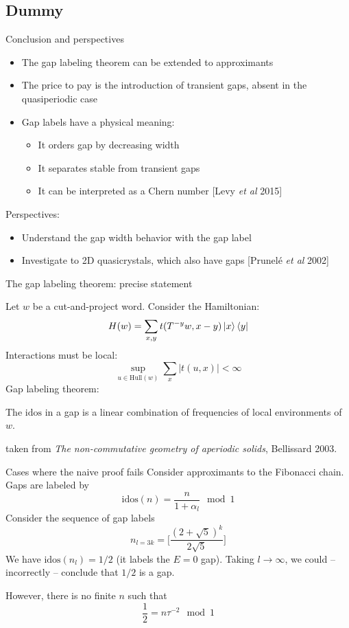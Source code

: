 \documentclass[xcolor=x11names,compress,professionalfonts]{beamer}
\renewcommand{\(}{\begin{columns}}
\renewcommand{\)}{\end{columns}}
\newcommand{\<}[1]{\begin{column}{#1}}
\renewcommand{\>}{\end{column}}
\newcommand{\id}{\ensuremath{\text{idos}}}
\begin{document}
\subsection{Dummy}
\begin{frame}{Conclusion and perspectives}
\begin{itemize}
	\item The gap labeling theorem can be extended to approximants
	\item The price to pay is the introduction of transient gaps, absent in the quasiperiodic case
	\item Gap labels have a physical meaning:
	\begin{itemize}
		\item It orders gap by decreasing width
		\item It separates stable from transient gaps
		\item It can be interpreted as a Chern number \small{[Levy \emph{et al} 2015]}
	\end{itemize}
\end{itemize}
Perspectives:
\begin{itemize}
	\item Understand the gap width behavior with the gap label
	\item Investigate to 2D quasicrystals, which also have gaps \small{[Prunelé \emph{et al} 2002]}
\end{itemize}
\end{frame}

\begin{frame}{The gap labeling theorem: precise statement}

Let $w$ be a cut-and-project word.
Consider the Hamiltonian:
\[
	H(w) = \sum_{x,y} t( T^{-y}w, x-y) \ket{x} \bra{y}
\]
Interactions must be local:
\[
	\sup_{u \in \text{Hull}(w)} \sum_x |t(u, x)| < \infty
\]
Gap labeling theorem:

The $\id$ in a gap is a linear combination of frequencies of local environments of $w$.
{\flushright
\small{taken from \textit{The non-commutative geometry of aperiodic solids}, Bellissard 2003.}

}
\end{frame}

\begin{frame}{Cases where the naive proof fails}
Consider approximants to the Fibonacci chain.
Gaps are labeled by
\[
	\id(n) = \frac{n}{1+\alpha_l} \mod 1
\]
Consider the sequence of gap labels
\[
	n_{l = 3k} = \Bigg[ \frac{(2+\sqrt{5})^k}{2 \sqrt{5}}\Bigg]
\]
We have $\id(n_l) = 1/2$ (it labels the $E=0$ gap).
Taking $l \to \infty$, we could -- incorrectly -- conclude that $1/2$ is a gap.

However, there is no finite $n$ such that
\[
	\frac{1}{2} = n \tau^{-2} \mod 1
\]

\end{frame}
\end{document}
